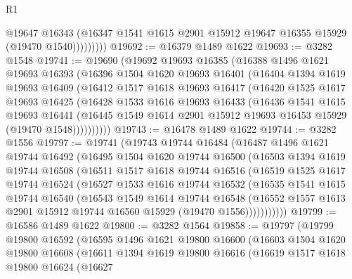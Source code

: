 \begin{lexlean}{R1}
\begin{coremodule}
                  @19647
                  @16343
                  (@16347 @1541 @1615 @2901 @15912 @19647 @16355 @15929 (@19470 @1540)))))))))
@19692 := @16379 @1489 @1622
@19693 := @3282 @1548
@19741 := @19690
    (@19692
      @19693
      @16385
      (@16388
        @1496
        @1621
        @19693
        @16393
        (@16396
          @1504
          @1620
          @19693
          @16401
          (@16404
            @1394
            @1619
            @19693
            @16409
            (@16412
              @1517
              @1618
              @19693
              @16417
              (@16420
                @1525
                @1617
                @19693
                @16425
                (@16428
                  @1533
                  @1616
                  @19693
                  @16433
                  (@16436
                    @1541
                    @1615
                    @19693
                    @16441
                    (@16445 @1549 @1614 @2901 @15912 @19693 @16453 @15929 (@19470 @1548))))))))))
@19743 := @16478 @1489 @1622
@19744 := @3282 @1556
@19797 := @19741
    (@19743
      @19744
      @16484
      (@16487
        @1496
        @1621
        @19744
        @16492
        (@16495
          @1504
          @1620
          @19744
          @16500
          (@16503
            @1394
            @1619
            @19744
            @16508
            (@16511
              @1517
              @1618
              @19744
              @16516
              (@16519
                @1525
                @1617
                @19744
                @16524
                (@16527
                  @1533
                  @1616
                  @19744
                  @16532
                  (@16535
                    @1541
                    @1615
                    @19744
                    @16540
                    (@16543
                      @1549
                      @1614
                      @19744
                      @16548
                      (@16552 @1557 @1613 @2901 @15912 @19744 @16560 @15929 (@19470 @1556)))))))))))
@19799 := @16586 @1489 @1622
@19800 := @3282 @1564
@19858 := @19797
    (@19799
      @19800
      @16592
      (@16595
        @1496
        @1621
        @19800
        @16600
        (@16603
          @1504
          @1620
          @19800
          @16608
          (@16611
            @1394
            @1619
            @19800
            @16616
            (@16619
              @1517
              @1618
              @19800
              @16624
              (@16627

\end{coremodule}
\end{lexlean}
